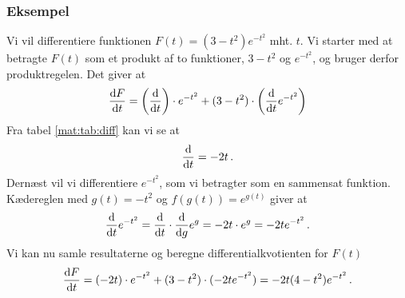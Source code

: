 \subsubsection{Eksempel}
Vi vil differentiere funktionen $F(t) = (3 - t^2) e^{-t^2}$
mht. $t$. Vi starter med at betragte $F(t)$ som et produkt af to
funktioner, $3-t^2$ og $e^{-t^2}$, og bruger derfor produktregelen. Det giver at
\[
\dv{F}{t} =
\left(\dv{}{t} (3-t^2)\right) \cdot e^{-t^2}
+ (3-t^2) \cdot \left(\dv{}{t} e^{-t^2}\right)
\]
Fra tabel \ref{mat:tab:diff} kan vi se at
\[
\dv{}{t} (3-t^2) = -2t \, .
\]
Dernæst vil vi differentiere $e^{-t^2}$, som vi betragter som en
sammensat funktion. Kædereglen med $g(t) = -t^2$ og $f(g(t)) = e^{g(t)}$
giver at
\[
\dv{}{t} e^{-t^2} = \dv{}{t} (-t^2) \cdot \dv{}{g} e^g
= -2t \cdot e^g
= -2t e^{-t^2} \, .
\]
Vi kan nu samle resultaterne og beregne differentialkvotienten for $F(t)$
\[
\dv{F}{t} = (-2t) \cdot e^{-t^2} + (3-t^2) \cdot (-2t e^{-t^2})
= -2t(4 - t^2) e^{-t^2} \, .
\]